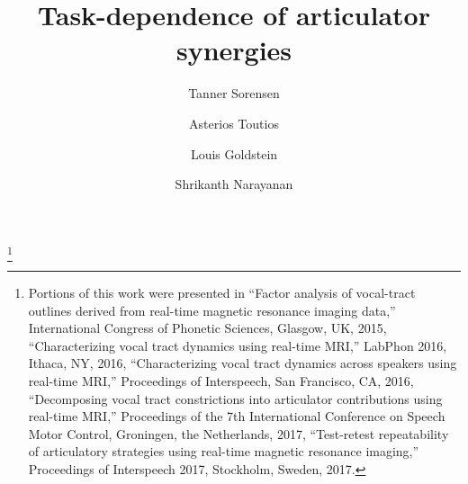 \documentclass[reprint]{JASAnew}\usepackage[]{graphicx}\usepackage[]{color}
\begin{document}
\title[Task dependence of articulator synergies]{Task-dependence of articulator synergies}

\thanks{Portions of this work were presented in 
``Factor analysis of vocal-tract outlines derived from real-time magnetic resonance imaging data,'' International Congress of Phonetic Sciences, Glasgow, UK, 2015,
``Characterizing vocal tract dynamics using real-time MRI,'' LabPhon 2016, Ithaca, NY, 2016,
``Characterizing vocal tract dynamics across speakers using real-time MRI,'' Proceedings of Interspeech, San Francisco, CA, 2016, 
``Decomposing vocal tract constrictions into articulator contributions using real-time MRI,'' Proceedings of the 7th International Conference on Speech Motor Control, Groningen, the Netherlands, 2017,
``Test-retest repeatability of articulatory strategies using real-time magnetic resonance imaging,'' Proceedings of Interspeech 2017, Stockholm, Sweden, 2017.}

\author{Tanner Sorensen}

\author{Asterios Toutios}

\author{Louis Goldstein}

\author{Shrikanth Narayanan}
\end{document}
